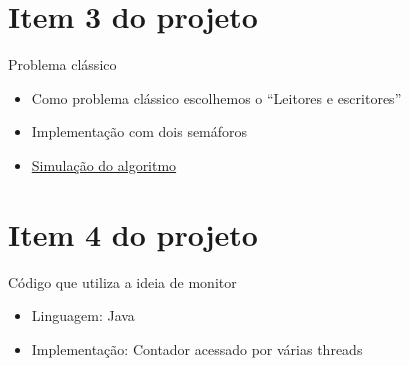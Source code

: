 \documentclass{beamer}
\begin{document}
\section{Item 3 do projeto}
\begin{frame}{Problema clássico}
	\begin{itemize}
		\item Como problema clássico escolhemos o ``Leitores e escritores''
		\item Implementação com dois semáforos
		\item  \textcolor{cyan}{\href{https://github.com/arcanjolevi/projeto_1_so/blob/master/item_3/tabela.pdf}{Simulação do algoritmo}}
	\end{itemize}
\end{frame}

\section{Item 4 do projeto}
\begin{frame}{Código que utiliza a ideia de monitor}
	\begin{itemize}
	    \item Linguagem: Java
	    \item Implementação: Contador acessado por várias threads
	\end{itemize}
\end{frame}
\end{document}
